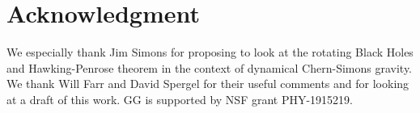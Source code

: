 \documentclass[prd,twocolumn,showpacs,superscriptaddress,nofootinbib]{revtex4-2}
\begin{document}
\section{Acknowledgment}
We especially thank Jim Simons for proposing to look at the rotating Black Holes and  Hawking-Penrose theorem in the context of dynamical Chern-Simons gravity. We thank Will Farr and David Spergel for their useful comments and for looking at a draft of this work. GG is supported by NSF grant PHY-1915219.
\normalem


\end{document}
